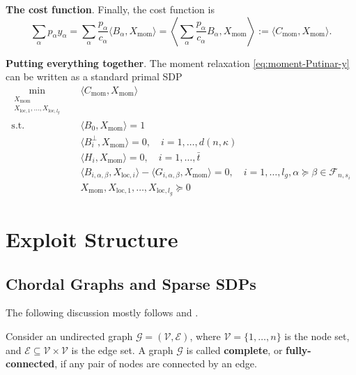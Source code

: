 \documentclass[
]{book}
\theoremstyle{definition}
\theoremstyle{definition}
\theoremstyle{definition}
\theoremstyle{definition}
\theoremstyle{remark}
\begin{document}
\textbf{The cost function}. Finally, the cost function is
\[
\sum_{\alpha} p_{\alpha} y_{\alpha} = \sum_{\alpha} \frac{p_{\alpha}}{c_{\alpha}} \langle B_{\alpha}, X_{\mathrm{mom}} \rangle = \left\langle \sum_{\alpha} \frac{p_{\alpha}}{c_{\alpha}} B_{\alpha} , X_{\mathrm{mom}} \right\rangle := \langle C_{\mathrm{mom}}, X_{\mathrm{mom}} \rangle.
\]

\textbf{Putting everything together}. The moment relaxation \eqref{eq:moment-Putinar-y} can be written as a standard primal SDP
\begin{equation}
\begin{split}
\min_{\substack{X_{\mathrm{mom}} \\ X_{\mathrm{loc},1},\dots,X_{\mathrm{loc},l_g}} } & \quad \langle C_{\mathrm{mom}}, X_{\mathrm{mom}} \rangle \\
\mathrm{s.t.}& \quad \langle B_0, X_{\mathrm{mom}} \rangle = 1 \\
& \quad \langle B_i^{\perp}, X_{\mathrm{mom}} \rangle = 0, \quad i=1,\dots,d(n,\kappa) \\
& \quad \langle H_i, X_{\mathrm{mom}} \rangle = 0, \quad i=1,\dots,\bar{t} \\
& \quad \langle B_{i,\alpha,\beta}, X_{\mathrm{loc},i} \rangle - \langle G_{i,\alpha,\beta}, X_{\mathrm{mom}} \rangle = 0, \quad i=1,\dots,l_g, \alpha\succeq\beta \in \mathcal{F}_{n,s_i} \\
& \quad X_{\mathrm{mom}},X_{\mathrm{loc},1},\dots,X_{\mathrm{loc},l_g} \succeq 0
\end{split}
\label{eq:moment-Putinar-standard-primal-SDP}
\end{equation}

\chapter{Exploit Structure}\label{Structure}

\section{Chordal Graphs and Sparse SDPs}\label{chordal-graphs-and-sparse-sdps}

The following discussion mostly follows \citep{zheng20mp-chordal} and \citep{vandenberghe15fto-chordal}.

Consider an undirected graph \(\mathcal{G}= (\mathcal{V},\mathcal{E})\), where \(\mathcal{V}=\{1,\dots,n \}\) is the node set, and \(\mathcal{E}\subseteq \mathcal{V}\times \mathcal{V}\) is the edge set. A graph \(\mathcal{G}\) is called \textbf{complete}, or \textbf{fully-connected}, if any pair of nodes are connected by an edge.
\end{document}
